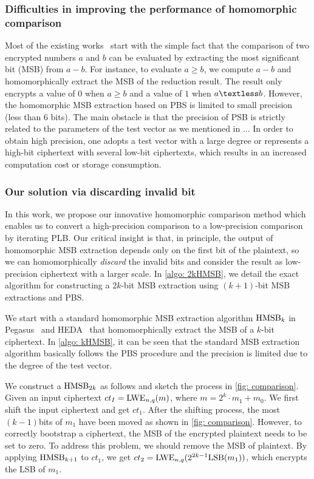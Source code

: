 \subsubsection{Difficulties in improving the performance of homomorphic comparison}
Most of the existing works~\cite{heda, pegasus,largeprecision} start with 
the simple fact that the comparison of two encrypted numbers $a$ and $b$
can be evaluated by extracting the most significant bit (MSB) from $a-b$.
For instance, to evaluate $a \geq b$, we compute $a -b$ and homomorphically
extract the MSB of the reduction result. 
The result only encrypts a value of $0$ when $a \geq b$ and 
a value of $1$ when $a \textless b$. 
However, the homomorphic MSB extraction based on PBS 
is limited to small precision (less than 6 bits). 
The main obstacle is that the precision of PSB is strictly 
related to the parameters of the test vector 
as we mentioned in ...
In order to obtain high precision, one adopts a test vector with a large
degree or represents a high-bit ciphertext with several low-bit ciphertexts, 
which results in an increased computation cost or storage consumption.


\subsubsection{Our solution via discarding invalid bit}
In this work, we propose our innovative homomorphic comparison method
which enables us to convert a high-precision comparison to 
a low-precision comparison by iterating PLB. 
Our critical insight is that, in principle, the output of 
homomorphic MSB extraction depends only on the first bit 
of the plaintext, so we can homomorphically \textit{discard}
the invalid bits and consider the result as low-precision 
ciphertext with a larger scale. In \cref{algo: 2kHMSB}, we detail the exact 
algorithm for constructing a $2k$-bit MSB extraction using
$(k+1)$-bit MSB extractions and PBS.

We start with a standard homomorphic MSB extraction algorithm 
${\rm HMSB}_{k}$ in Pegasus~\cite{pegasus} and HEDA~\cite{heda} 
that homomorphically extract the MSB of a $k$-bit ciphertext. 
In \cref{algo: kHMSB}, it can be seen that the standard 
MSB extraction algorithm basically follows the PBS procedure 
and the precision is limited due to the degree of the test vector.

We construct a ${\rm HMSB}_{2k}$ as follows and sketch the process in 
\cref{fig: comparison}. Given an input ciphertext 
$ct_{I} = {\rm LWE}_{n,q}(m)$, where $m=2^{k}\cdot m_1 + m_0$. We first 
shift the input ciphertext and get $ct_{1}$. After the shifting process, 
the most $(k-1)$bits of $m_{1}$ have been 
moved as shown in \cref{fig: comparison}. 
However, to correctly
bootstrap a ciphertext, the MSB of the encrypted plaintext needs to be set to zero.
To address this problem, we should remove the MSB of plaintext.
By applying ${\rm HMSB}_{k+1}$ to $ct_{1}$, we get 
$ct_{2} = {\rm LWE}_{n,q}(2^{2k-1}{\rm LSB}(m_{1}))$, which
encrypts the LSB of $m_{1}$. 

